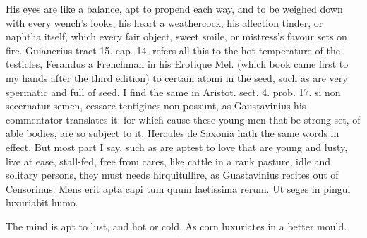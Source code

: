 His eyes are like a balance, apt to propend each way, and to be weighed
down with every wench's looks, his heart a weathercock, his affection
tinder, or naphtha itself, which every fair object, sweet smile, or
mistress's favour sets on fire. Guianerius tract 15. cap. 14. refers
all this to the hot temperature of the testicles, Ferandus a
Frenchman in his Erotique Mel. (which book came first to my hands
after the third edition) to certain atomi in the seed, such as are very
spermatic and full of seed. I find the same in Aristot. sect. 4. prob.
17. si non secernatur semen, cessare tentigines non possunt, as
Gaustavinius his commentator translates it: for which cause these young
men that be strong set, of able bodies, are so subject to it. Hercules
de Saxonia hath the same words in effect. But most part I say, such as
are aptest to love that are young and lusty, live at ease, stall-fed,
free from cares, like cattle in a rank pasture, idle and solitary
persons, they must needs hirquitullire, as Guastavinius recites out of
Censorinus.
Mens erit apta capi tum quum laetissima rerum.
Ut seges in pingui luxuriabit humo.

The mind is apt to lust, and hot or cold,
As corn luxuriates in a better mould.

